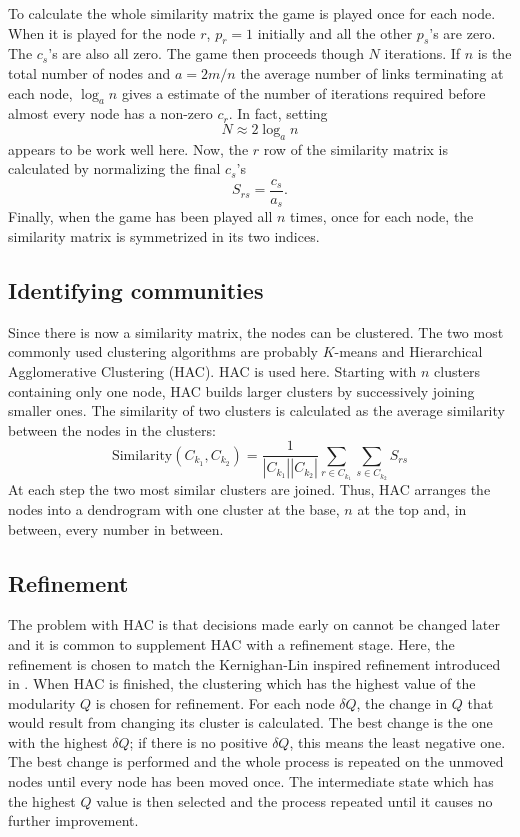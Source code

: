 \documentclass[12pt]{iopart}
\begin{document}
To calculate the whole similarity matrix the game is played once for
each node. When it is played for the node $r$, $p_r=1$ initially and
all the other $p_s$'s are zero. The $c_s$'s are also all zero. The
game then proceeds though $N$ iterations. If $n$ is the total number
of nodes and $a=2m/n$ the average number of links terminating at each
node, $\log_a{n}$ gives a estimate of the number of iterations
required before almost every node has a non-zero $c_r$. In fact,
setting
\begin{equation}
N\approx 2\log_a{n}
\end{equation}
appears to be work well here. Now, the $r$ row of the similarity matrix is
calculated by normalizing the final $c_s$'s
\begin{equation}
S_{rs}=\frac{c_s}{a_s}.
\end{equation}
Finally, when the game has been played all $n$ times, once for each
node, the similarity matrix is symmetrized in its two indices.

\subsection*{Identifying communities}

Since there is now a similarity matrix, the nodes can be
clustered. The two most commonly used clustering algorithms are
probably $K$-means and Hierarchical Agglomerative Clustering
(HAC). HAC is used here. Starting with $n$ clusters containing only
one node, HAC builds larger clusters by successively joining smaller
ones. The similarity of two clusters is calculated as the average
similarity between the nodes in the clusters:
\begin{equation}
\mbox{Similarity}(C_{k_1},C_{k_2})=\frac{1}{|C_{k_1}||C_{k_2}|}\sum_{r\in C_{k_1}}
\sum_{s\in C_{k_2}}S_{rs}
\end{equation}
At each step the two most similar clusters are joined. Thus, HAC arranges the
nodes into a dendrogram with one cluster at the base, $n$ at the top
and, in between, every number in between.

\subsection*{Refinement}

The problem with HAC is that decisions made early on cannot be changed
later and it is common to supplement HAC with a refinement
stage. Here, the refinement is chosen to match the Kernighan-Lin
inspired refinement introduced in \cite{Newman2006a}. When HAC is
finished, the clustering which has the highest value of the modularity
$Q$ is chosen for refinement. For each node $\delta Q$, the change in
$Q$ that would result from changing its cluster is calculated. The
best change is the one with the highest $\delta Q$; if there is no
positive $\delta Q$, this means the least negative one. The best
change is performed and the whole process is repeated on the unmoved
nodes until every node has been moved once. The intermediate state
which has the highest $Q$ value is then selected and the process
repeated until it causes no further improvement.
\end{document}
